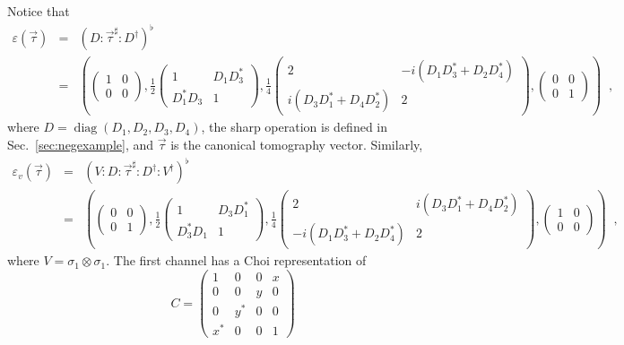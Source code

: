 Notice that
\begin{eqnarray*}
\varepsilon(\vec{\tau}) &=& \left(D:\vec{\tau}^\sharp: D^\dagger\right)^\flat \\
&=& \left(\begin{pmatrix}
1&0\\
0&0\end{pmatrix},\frac{1}{2}\begin{pmatrix}
1&D_1 D_3^*\\
D_1^* D_3 & 1\end{pmatrix},\frac{1}{4}\begin{pmatrix}
2&- i \left(D_1 D_3^* + D_2 D_4^*\right)\\
i \left(D_3 D_1^* + D_4 D_2^*\right)&2\end{pmatrix},\begin{pmatrix}
0&0\\
0&1\end{pmatrix}\right)\;\;,
\end{eqnarray*}
where $D=\operatorname{diag}(D_1,D_2,D_3,D_4)$, the sharp operation is defined in Sec.\ \ref{sec:negexample}, and $\vec{\tau}$ is the canonical tomography vector.  Similarly,
\begin{eqnarray*}
\varepsilon_v(\vec{\tau}) &=& \left(V:D:\vec{\tau}^\sharp: D^\dagger: V^\dagger\right)^\flat \\
&=& \left(\begin{pmatrix}
0&0\\
0&1\end{pmatrix},\frac{1}{2}\begin{pmatrix}
1&D_3 D_1^*\\
D_3^* D_1 & 1\end{pmatrix},\frac{1}{4}\begin{pmatrix}
2& i \left(D_3 D_1^* + D_4 D_2^*\right)\\
- i \left(D_1 D_3^* + D_2 D_4^*\right)&2\end{pmatrix},\begin{pmatrix}
1&0\\
0&0\end{pmatrix}\right)\;\;,
\end{eqnarray*}
where $V=\sigma_1\otimes\sigma_1$.  The first channel has a Choi representation of
\begin{equation}
\label{eqn:Obasis}
C = \begin{pmatrix}
1&0&0&x\\
0&0&y&0\\
0&y^*&0&0\\
x^*&0&0&1
\end{pmatrix}
\end{equation}
